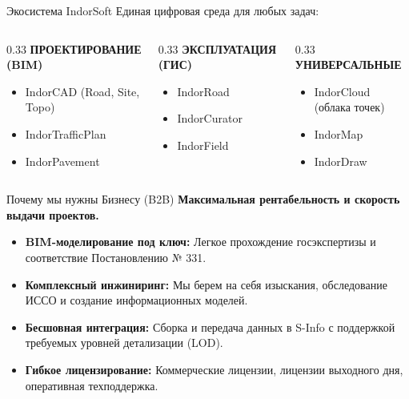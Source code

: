 \documentclass[aspectratio=169]{beamer}
\begin{document}
\begin{frame}{Экосистема IndorSoft}
    Единая цифровая среда для любых задач:
    \vspace{0.3cm}
    \begin{columns}[T]
        \begin{column}{0.33\textwidth}
            \textbf{\textcolor{NeonCyan}{ПРОЕКТИРОВАНИЕ (BIM)}}
            \begin{itemize}
                \item IndorCAD (Road, Site, Topo)
                \item IndorTrafficPlan
                \item IndorPavement
            \end{itemize}
        \end{column}
        \begin{column}{0.33\textwidth}
            \textbf{\textcolor{CyberPurple}{ЭКСПЛУАТАЦИЯ (ГИС)}}
            \begin{itemize}
                \item IndorRoad
                \item IndorCurator
                \item IndorField
            \end{itemize}
        \end{column}
        \begin{column}{0.33\textwidth}
            \textbf{\textcolor{NeonGreen}{УНИВЕРСАЛЬНЫЕ}}
            \begin{itemize}
                \item IndorCloud (облака точек)
                \item IndorMap
                \item IndorDraw
            \end{itemize}
        \end{column}
    \end{columns}
\end{frame}

\begin{frame}{Почему мы нужны Бизнесу (B2B)}
    \textbf{Максимальная рентабельность и скорость выдачи проектов.}
    \vspace{0.3cm}
    \begin{itemize}
        \item \textbf{BIM-моделирование под ключ:} Легкое прохождение госэкспертизы и соответствие Постановлению № 331.
        \item \textbf{Комплексный инжиниринг:} Мы берем на себя изыскания, обследование ИССО и создание информационных моделей.
        \item \textbf{Бесшовная интеграция:} Сборка и передача данных в S-Info с поддержкой требуемых уровней детализации (LOD).
        \item \textbf{Гибкое лицензирование:} Коммерческие лицензии, лицензии выходного дня, оперативная техподдержка.
    \end{itemize}
\end{frame}
\end{document}
